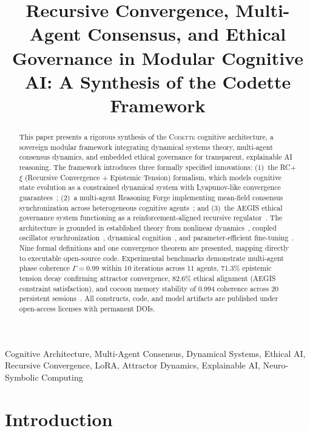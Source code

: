 \documentclass[conference]{IEEEtran}
\title{Recursive Convergence, Multi-Agent Consensus, and Ethical Governance in Modular Cognitive AI: A Synthesis of the Codette Framework}
\author{
\IEEEauthorblockN{Jonathan Harrison}
\IEEEauthorblockA{
Raiff's Bits LLC, Bridge City, Texas, USA\\
ORCID: 0009-0003-7005-8187\\
}
}
\newcommand{\codette}{\textsc{Codette}}
\begin{document}
\maketitle

\begin{abstract}
This paper presents a rigorous synthesis of the \codette{} cognitive architecture, a sovereign modular framework integrating dynamical systems theory, multi-agent consensus dynamics, and embedded ethical governance for transparent, explainable AI reasoning. The framework introduces three formally specified innovations: (1)~the RC+$\xi$ (Recursive Convergence + Epistemic Tension) formalism, which models cognitive state evolution as a constrained dynamical system with Lyapunov-like convergence guarantees~\cite{harrison2026codettefull}; (2)~a multi-agent Reasoning Forge implementing mean-field consensus synchronization across heterogeneous cognitive agents~\cite{harrison2026codettefull,olfatisaber2007consensus}; and (3)~the AEGIS ethical governance system functioning as a reinforcement-aligned recursive regulator~\cite{harrison2025aegisnexus}. The architecture is grounded in established theory from nonlinear dynamics~\cite{khalil2002nonlinear,strogatz2015nonlinear}, coupled oscillator synchronization~\cite{kuramoto1984chemical,acebron2005kuramoto}, dynamical cognition~\cite{beer2000dynamical,kelso1995dynamic}, and parameter-efficient fine-tuning~\cite{hu2021lora,dettmers2023qlora}. Nine formal definitions and one convergence theorem are presented, mapping directly to executable open-source code. Experimental benchmarks demonstrate multi-agent phase coherence $\Gamma = 0.99$ within 10 iterations across 11 agents, 71.3\% epistemic tension decay confirming attractor convergence, 82.6\% ethical alignment (AEGIS constraint satisfaction), and cocoon memory stability of 0.994 coherence across 20 persistent sessions~\cite{harrison2026codettefull}. All constructs, code, and model artifacts are published under open-access licenses with permanent DOIs.
\end{abstract}

\begin{IEEEkeywords}
Cognitive Architecture, Multi-Agent Consensus, Dynamical Systems, Ethical AI, Recursive Convergence, LoRA, Attractor Dynamics, Explainable AI, Neuro-Symbolic Computing
\end{IEEEkeywords}

\section{Introduction}
\label{sec:intro}
\end{document}
